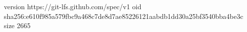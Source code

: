 version https://git-lfs.github.com/spec/v1
oid sha256:e610f985a579fbc9a468c7de8d7ae85226121aabdb1dd30a25bf3540bba4be3c
size 2665
